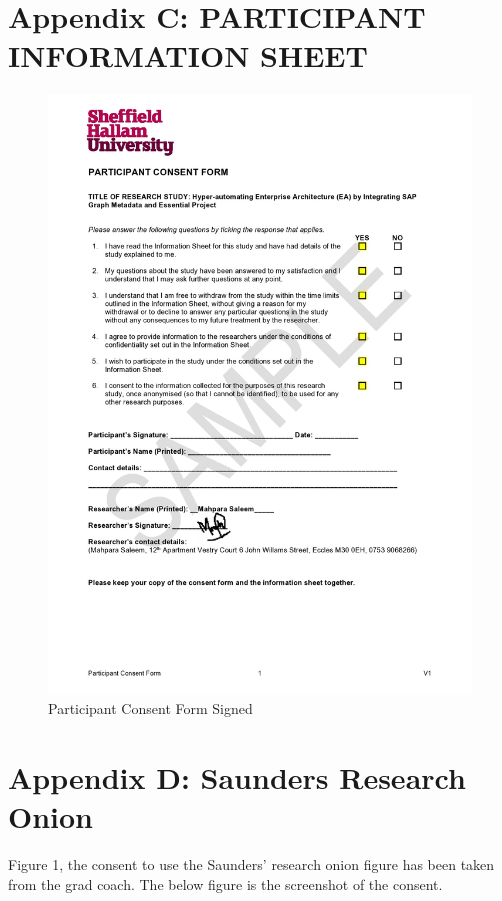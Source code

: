 \documentclass{article}
\begin{document}
\section{Appendix C: PARTICIPANT INFORMATION SHEET}

\begin{figure}[ht!]
    \centering
    \includegraphics[scale=0.35]{participant-consent-form}
    \caption{Participant Consent Form Signed}
    \label{fig:participant-consent}
\end{figure}


\section{Appendix D: Saunders Research Onion}
Figure 1, the consent to use the Saunders' research onion figure has been taken from the grad coach. The below figure is the screenshot of the consent.
\end{document}
